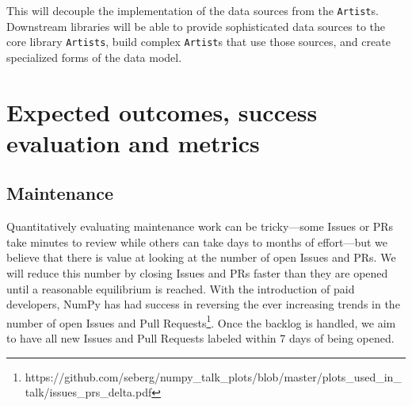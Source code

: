 \documentclass[12pt,letterpaper]{article}  %
\begin{document}
This will decouple the implementation of the data sources from the
\texttt{Artist}s.  Downstream libraries will be able to provide
sophisticated data sources to the core library \texttt{Artists}, build
complex \texttt{Artist}s that use those sources, and create
specialized forms of the data model.


\section{Expected outcomes, success evaluation and metrics}
\subsection{Maintenance}

Quantitatively evaluating maintenance work can be tricky---some Issues
or PRs take minutes to review while others can take days to months of
effort---but we believe that there is value at looking at the number
of open Issues and PRs.  We will reduce this number by closing Issues
and PRs faster than they are opened until a reasonable equilibrium is
reached. With the introduction of paid developers, NumPy has had
success in reversing the ever increasing trends in the number of open
Issues and Pull
Requests\footnote{https://github.com/seberg/numpy\_talk\_plots/blob/master/plots\_used\_in\_talk/issues\_prs\_delta.pdf}. Once
the backlog is handled, we aim to have all new Issues and Pull
Requests labeled within 7 days of being opened.
\end{document}
